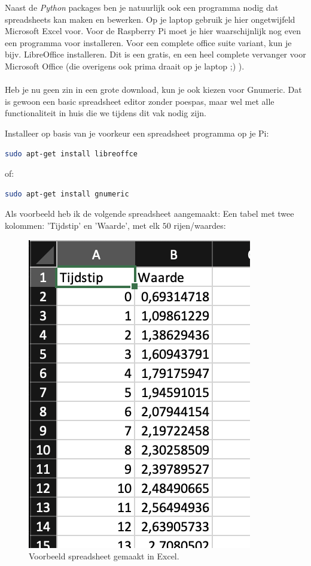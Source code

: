 Naast de \textit{Python} packages ben je natuurlijk ook een programma nodig dat spreadsheets kan maken en bewerken. Op je laptop gebruik je hier ongetwijfeld Microsoft Excel voor. Voor de Raspberry Pi moet je hier waarschijnlijk nog even een programma voor installeren. Voor een complete office suite variant, kun je bijv. LibreOffice installeren. Dit is een gratis, en een heel complete vervanger voor Microsoft Office (die overigens ook prima draait op je laptop ;) ).\\\\ 
Heb je nu geen zin in een grote download, kun je ook kiezen voor Gnumeric. Dat is gewoon een basic spreadsheet editor zonder poespas, maar wel met alle functionaliteit in huis die we tijdens dit vak nodig zijn.

\begin{exercise}
Installeer op basis van je voorkeur een spreadsheet programma op je Pi:
\begin{lstlisting}[language=bash]
sudo apt-get install libreoffce
\end{lstlisting}
of:
\begin{lstlisting}[language=bash]
sudo apt-get install gnumeric
\end{lstlisting}
\end{exercise}

Als voorbeeld heb ik de volgende spreadsheet aangemaakt: Een tabel met twee kolommen: 'Tijdstip' en 'Waarde', met elk $50$ rijen/waardes: 
\begin{figure}[h!]
\centering\includegraphics[scale=0.7]{Pictures/chapter07/excel1.png}
\caption{Voorbeeld spreadsheet gemaakt in Excel.}
\label{fig:excel1} %
\end{figure}

